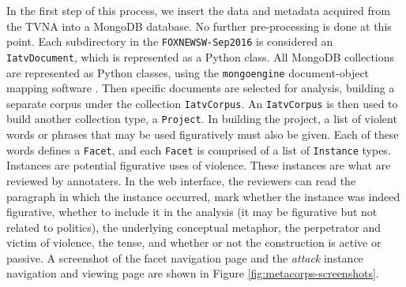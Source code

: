 In the first step of this process, we insert the data and metadata
acquired from the TVNA into a MongoDB database. No further pre-processing is done 
at this point.
Each subdirectory in the \texttt{FOXNEWSW-Sep2016} is considered an \texttt{IatvDocument},
which is represented as a Python class. All MongoDB collections are represented
as Python classes, using the \texttt{mongoengine} document-object mapping software
\cite{Mongoengine2017}. Then specific documents are selected for analysis, 
building a separate corpus under the collection \texttt{IatvCorpus}. 
An \texttt{IatvCorpus} is then used to build another collection type, a
\texttt{Project}. In building the project, a list of 
violent words or phrases that may be used figuratively must also be given.
Each of these words defines a \texttt{Facet}, and each \texttt{Facet} is comprised
of a list of \texttt{Instance} types. Instances are potential figurative uses
of violence. These instances are what are reviewed by annotaters.
In the web interface, the reviewers can read the paragraph in which the
instance occurred, mark whether the instance was indeed figurative, whether to
include it in the analysis (it may be figurative but not related to politics),
the underlying conceptual metaphor, the perpetrator and victim of violence,
the tense, and whether or not the construction is active or passive. A 
screenshot of the facet navigation page and the \textit{attack} instance
navigation and viewing page are shown in Figure \ref{fig:metacorps-screenshots}.

